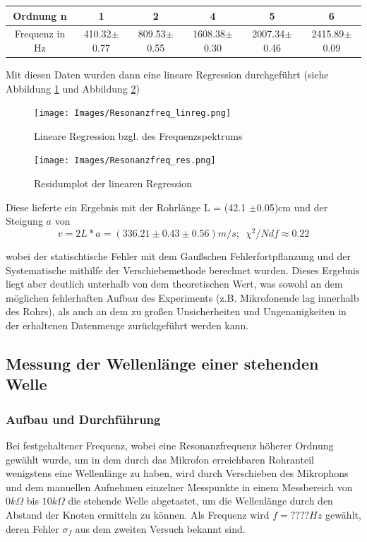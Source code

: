 \documentclass[]{article}
\begin{document}
	\begin{tabular}{|c|c|c|c|c|c|}
		\hline 
		Ordnung n&1  &2  &4  &5 &6  \\ 
		\hline 
		Frequenz in Hz& 410.32$\pm$0.77 &809.53$\pm$0.55  &1608.38$\pm$0.30  &2007.34$\pm$0.46  &2415.89$\pm$0.09  \\ 
		\hline 
	\end{tabular}

	\bigskip
	Mit diesen Daten wurden dann eine lineare Regression durchgeführt (siehe Abbildung \ref{linreg_freq} und Abbildung \ref{linreg_res})
	\begin{figure}
		\begin{center}
			\texttt{[image: Images/Resonanzfreq\_linreg.png]}
			\caption{Lineare Regression bzgl. des Frequenzspektrums}
			\label{linreg_freq}
		\end{center}
	\end{figure}
	\begin{figure}
		\begin{center}
			\texttt{[image: Images/Resonanzfreq\_res.png]}
			\caption{Residumplot der linearen Regression}
			\label{linreg_res}
		\end{center}
	\end{figure}

	Diese lieferte ein Ergebnis mit der Rohrlänge L = (42.1 $\pm$0.05)cm und der Steigung $a$ von 
	\begin{equation}
		v = 2L*a = (336.21 \pm 0.43 \pm 0.56) m/s; \, \, \, \chi^2/Ndf \approx 0.22
	\end{equation}
	
	wobei der statischtische Fehler mit dem Gaußschen Fehlerfortpflanzung und der Systematische mithilfe der Verschiebemethode berechnet wurden. Dieses Ergebnis liegt aber deutlich unterhalb von dem theoretischen Wert, was sowohl an dem möglichen fehlerhaften Aufbau des Experiments (z.B. Mikrofonende lag innerhalb des Rohrs), als auch an dem zu großen Unsicherheiten und Ungenauigkeiten in der erhaltenen Datenmenge zurückgeführt werden kann.
	
	\subsection{Messung der Wellenlänge einer stehenden Welle}
	\subsubsection{Aufbau und Durchführung}
	Bei festgehaltener Frequenz, wobei eine Resonanzfrequenz höherer Ordnung gewählt wurde, um in dem durch das Mikrofon erreichbaren Rohranteil wenigstens eine Wellenlänge zu haben, wird durch Verschieben des Mikrophons und dem manuellen Aufnehmen einzelner Messpunkte in einem Messbereich von $0k\Omega$ bis $10k\Omega$ die stehende Welle abgetastet, um die Wellenlänge durch den Abstand der Knoten ermitteln zu können. Als Frequenz wird $f=????Hz$ gewählt, deren Fehler $\sigma_f$ aus dem zweiten Versuch bekannt sind.
\end{document}
